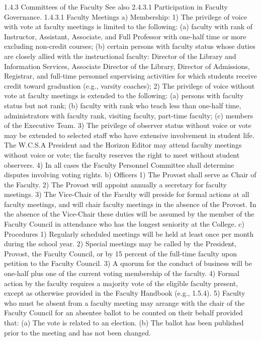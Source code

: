 \documentclass[letterpaper, 11pt]{article}
\begin{document}
1.4.3 Committees of the Faculty
   See also 2.4.3.1 Participation in Faculty Governance.
1.4.3.1 Faculty Meetings
a) Membership:
1) The privilege of voice with vote at faculty meetings is limited to the following:
(a) faculty with rank of Instructor, Assistant, Associate, and Full Professor with one-half time or more excluding non-credit courses;
(b) certain persons with faculty status whose duties are closely allied with the instructional faculty:  Director of the Library and Information Services, Associate Director of the Library, Director of Admissions, Registrar, and full-time personnel supervising activities for which students receive credit toward graduation (e.g., varsity coaches);
2) The privilege of voice without vote at faculty meetings is extended to the following:
(a) persons with faculty status but not rank;
(b) faculty with rank who teach less than one-half time, administrators with faculty rank, visiting faculty, part-time faculty;
(c) members of the Executive Team.
3) The privilege of observer status without voice or vote may be extended to selected staff who have extensive involvement in student life.  The W.C.S.A President and the Horizon Editor may attend faculty meetings without voice or vote; the faculty reserves the right to meet without student observers.
4) In all cases the Faculty Personnel Committee shall determine disputes involving voting rights.
b) Officers
1) The Provost shall serve as Chair of the Faculty.
2) The Provost will appoint annually a secretary for faculty meetings.
3) The Vice-Chair of the Faculty will preside for formal actions at all faculty meetings, and will chair faculty meetings in the absence of the Provost.  In the absence of the Vice-Chair these duties will be assumed by the member of the Faculty Council in attendance who has the longest seniority at the College.
c) Procedures
1) Regularly scheduled meetings will be held at least once per month during the school year.
2) Special meetings may be called by the President, Provost, the Faculty Council, or by 15 percent of the full-time faculty upon petition to the Faculty Council.
3) A quorum for the conduct of business will be one-half plus one of the current voting membership of the faculty.
4) Formal action by the faculty requires a majority vote of the eligible faculty present, except as otherwise provided in the Faculty Handbook (e.g., 1.5.4).
5) Faculty who must be absent from a faculty meeting may arrange with the chair of the Faculty Council for an absentee ballot to be counted on their behalf provided that:
(a) The vote is related to an election.
(b) The ballot has been published prior to the meeting and has not been changed.
\end{document}
